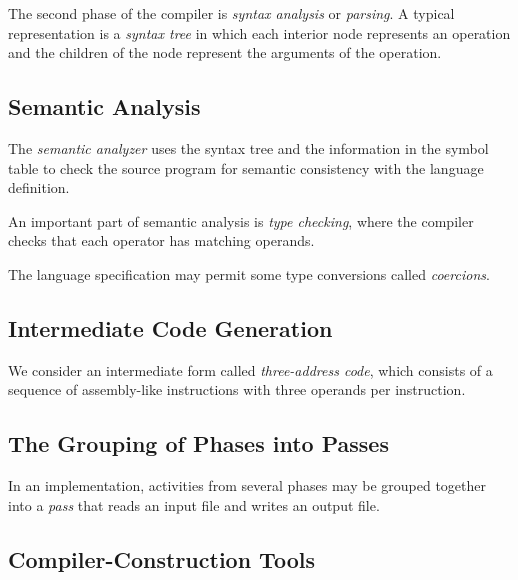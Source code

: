\documentclass[a4paper,twoside]{book}
\begin{document}
The second phase of the compiler is \textit{syntax analysis} or \textit{parsing}. A typical representation is a \textit{syntax tree} in which each interior node represents an operation and the children of the node represent the arguments of the operation.

\subsection{Semantic Analysis}

The \textit{semantic analyzer} uses the syntax tree and the information in the symbol table to check the source program for semantic consistency with the language definition.

An important part of semantic analysis is \textit{type checking}, where the compiler checks that each operator has matching operands.

The language specification may permit some type conversions called \textit{coercions}.

\subsection{Intermediate Code Generation}

We consider an intermediate form called \textit{three-address code}, which consists of a sequence of assembly-like instructions with three operands per instruction.

\subsection{The Grouping of Phases into Passes}

In an implementation, activities from several phases may be grouped together into a \textit{pass} that reads an input file and writes an output file.

\subsection{Compiler-Construction Tools}
\end{document}
